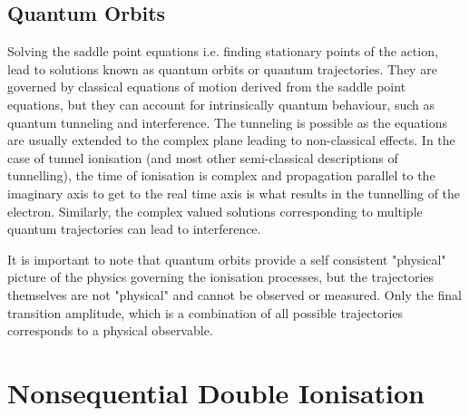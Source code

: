 \documentclass[11pt]{article}
\numberwithin{equation}{section}
\begin{document}
\subsection{Quantum Orbits}\label{ch:QO}
Solving the saddle point equations i.e. finding stationary points of the action, lead to solutions known as quantum orbits or quantum trajectories. They are governed by classical equations of motion derived from the saddle point equations, but they can account for intrinsically quantum behaviour, such as quantum tunneling and interference. The tunneling is possible as the equations are usually extended to the complex plane leading to non-classical effects. In the case of tunnel ionisation (and most other semi-classical descriptions of tunnelling), the time of ionisation is complex and propagation parallel to the imaginary axis to get to the real time axis is what results in the tunnelling of the electron. Similarly, the complex valued solutions corresponding to multiple quantum trajectories can lead to interference.
\par
It is important to note that quantum orbits provide a self consistent "physical" picture of the physics governing the ionisation processes, but the trajectories themselves are not "physical" and cannot be observed or measured. Only the final transition amplitude, which is a combination of all possible trajectories corresponds to a physical observable.

\section{Nonsequential Double Ionisation} \label{ch:NSDI}
\end{document}
